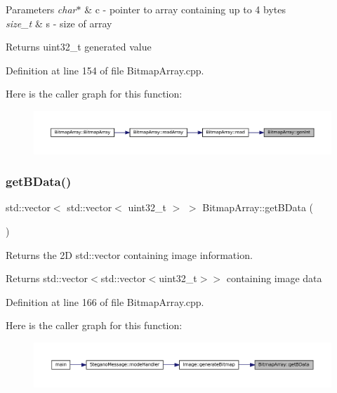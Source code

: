 \begin{DoxyParams}{Parameters}
{\em char$\ast$} & c -\/ pointer to array containing up to 4 bytes \\
\hline
{\em size\+\_\+t} & s -\/ size of array \\
\hline
\end{DoxyParams}
\begin{DoxyReturn}{Returns}
uint32\+\_\+t generated value 
\end{DoxyReturn}


Definition at line 154 of file Bitmap\+Array.\+cpp.

Here is the caller graph for this function\+:\nopagebreak
\begin{figure}[H]
\begin{center}
\leavevmode
\includegraphics[width=350pt]{classBitmapArray_a158fbbaa026332a732f644a8c368a2f0_icgraph}
\end{center}
\end{figure}
\mbox{\label{classBitmapArray_a66bd389c357de601df924569a0b38429}} 
\subsubsection{\texorpdfstring{getBData()}{getBData()}}
{\footnotesize\ttfamily std\+::vector$<$ std\+::vector$<$ uint32\+\_\+t $>$ $>$ Bitmap\+Array\+::get\+B\+Data (\begin{DoxyParamCaption}{ }\end{DoxyParamCaption})}



Returns the 2D std\+::vector containing image information. 

\begin{DoxyReturn}{Returns}
std\+::vector$<$std\+::vector$<$uint32\+\_\+t$>$$>$ containing image data 
\end{DoxyReturn}


Definition at line 166 of file Bitmap\+Array.\+cpp.

Here is the caller graph for this function\+:\nopagebreak
\begin{figure}[H]
\begin{center}
\leavevmode
\includegraphics[width=350pt]{classBitmapArray_a66bd389c357de601df924569a0b38429_icgraph}
\end{center}
\end{figure}
\mbox{\label{classBitmapArray_ab914d6282460b386b2b5f936190487a2}} 
